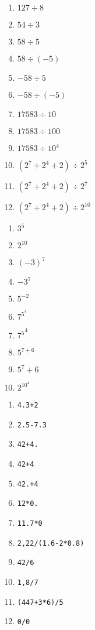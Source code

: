\begin{multicols}{2}
  \begin{enumerate}[label=\emph{\alph*)}]
    \item $127 \div 8$
    \item $54 \div 3$
    \item $58 \div 5$
    \item $58 \div (-5)$
    \item $-58 \div 5$
    \item $-58 \div (-5)$
    \item $17583 \div 10$
    \item $17583 \div 100$
    \item $17583 \div 10^4$
    \item $(2^7+2^4+2) \div 2^5$
    \item $(2^7+2^4+2) \div 2^7$
    \item $(2^7+2^4+2) \div 2^{10}$
  \end{enumerate}
\end{multicols}
\begin{multicols}{2}
  \begin{enumerate}[label=\emph{\alph*)}]
    \item $3^5$
    \item $2^{10}$
    \item $(-3)^7$
    \item $-3^7$
    \item $5^{-2}$
    \item $7^{{5^4}}$
    \item ${7^5}^4$
    \item $5^{7+6}$
    \item $5^7+6$
    \item $2^{{10^4}}$
  \end{enumerate}
\end{multicols}



\begin{multicols}{2}
  \begin{enumerate}[label=\emph{\alph*)}]
    \item \texttt{4.3+2}
    \item \texttt{2.5-7.3}
    \item \texttt{42+4.}
    \item \texttt{42+4}
    \item \texttt{42.+4}
    \item \texttt{12*0.}
    \item \texttt{11.7*0}
    \item \texttt{2,22/(1.6-2*0.8)}
    \item \texttt{42/6}
    \item \texttt{1,8/7}
    \item \texttt{(447+3*6)/5}
    \item \texttt{0/0}
  \end{enumerate}
\end{multicols}

